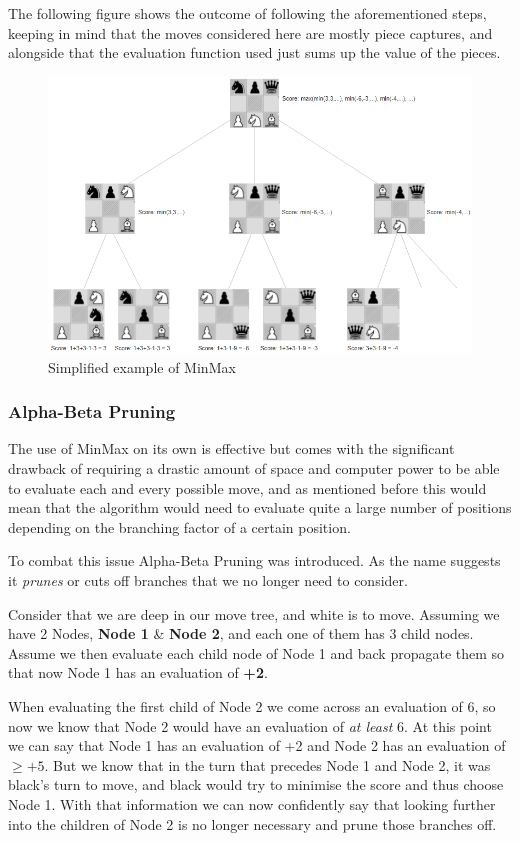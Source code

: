 The following figure shows the outcome of following the aforementioned steps, keeping in mind that the moves considered here are mostly piece captures, and alongside that the evaluation function used just sums up the value of the pieces.

\begin{figure}[h]
    \centering
    \includegraphics[scale=0.45]{images/minMaxscored.png}
    \caption{Simplified example of MinMax}
    \label{minmax}
\end{figure}

\subsubsection{Alpha-Beta Pruning}

The use of MinMax on its own is effective but comes with the significant drawback of requiring a drastic amount of space and computer power to be able to evaluate each and every possible move, and as mentioned before this would mean that the algorithm would need to evaluate quite a large number of positions depending on the branching factor of a certain position.

To combat this issue Alpha-Beta Pruning was introduced. As the name suggests it \textit{prunes} or cuts off branches that we no longer need to consider. 

Consider that we are deep in our move tree, and white is to move. Assuming we have 2 Nodes, \textbf{Node 1} \& \textbf{Node 2}, and each one of them has 3 child nodes. Assume we then evaluate each child node of Node 1 and back propagate them so that now Node 1 has an evaluation of \textbf{+2}.

When evaluating the first child of Node 2 we come across an evaluation of 6, so now we know that Node 2 would have an evaluation of \textit{at least} 6. At this point we can say that Node 1 has an evaluation of +2 and Node 2 has an evaluation of $\geq+5$. But we know that in the turn that precedes Node 1 and Node 2, it was black's turn to move, and black would try to minimise the score and thus choose Node 1. With that information we can now confidently say that looking further into the children of Node 2 is no longer necessary and prune those branches off.

